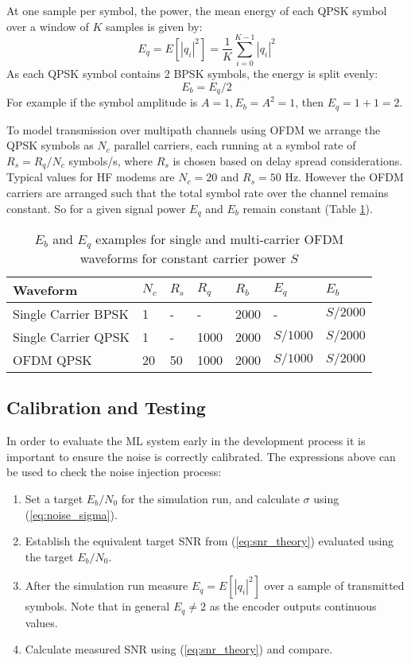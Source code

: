 \documentclass{article}
\begin{document}
At one sample per symbol, the power, the mean energy of each QPSK symbol over a window of $K$ samples is given by:
\begin{equation}
E_q = E[|q_i|^2] = \frac{1}{K}\sum_{i=0}^{K-1}|q_i|^2
\end{equation}
As each QPSK symbol contains 2 BPSK symbols, the energy is split evenly:
\begin{equation}
E_b = E_q/2
\end{equation}
For example if the symbol amplitude is $A=1, E_b=A^2=1$, then $E_q=1+1=2$.

To model transmission over multipath channels using OFDM we arrange the QPSK symbols as $N_c$ parallel carriers, each running at a symbol rate of $R_s=R_q/N_c$ symbols/s, where $R_s$ is chosen based on delay spread considerations.  Typical values for HF modems are $N_c=20$ and $R_s=50$ Hz. However the OFDM carriers are arranged such that the total symbol rate over the channel remains constant.  So for a given signal power $E_q$ and $E_b$ remain constant (Table \ref{tab:constant_eb}).

\begin{table} [H]
\centering
\begin{tabular}{l l l l l l l}
 \hline
 Waveform            & $N_c$ & $R_s$ & $R_q$ & $R_b$ & $E_q$ & $E_b$ \\
 \hline
 Single Carrier BPSK & 1     & -  & -    & 2000  & -        & $S/2000$ \\
 Single Carrier QPSK & 1     & -  & 1000 & 2000  & $S/1000$ & $S/2000$ \\
 OFDM QPSK           & 20    & 50 & 1000 & 2000  & $S/1000$ & $S/2000$ \\
 \hline
\end{tabular}
\caption{$E_b$ and $E_q$ examples for single and multi-carrier OFDM waveforms for constant carrier power $S$}
\label{tab:constant_eb}
\end{table}

\subsection{Calibration and Testing}

In order to evaluate the ML system early in the development process it is important to ensure the noise is correctly calibrated. The expressions above can be used to check the noise injection process:
\begin{enumerate}
\item Set a target $E_b/N_0$ for the simulation run, and calculate $\sigma$ using (\ref{eq:noise_sigma}).
\item Establish the equivalent target SNR from (\ref{eq:snr_theory}) evaluated using the target $E_b/N_0$.
\item After the simulation run measure $E_q=E[|q_i|^2]$ over a sample of transmitted symbols.  Note that in general $E_q \ne 2$ as the encoder outputs continuous values.
\item Calculate measured SNR using (\ref{eq:snr_theory}) and compare.
\end{enumerate}
\end{document}
